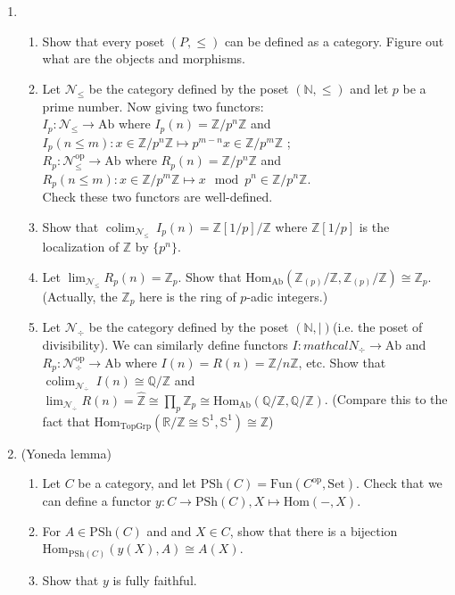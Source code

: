 \documentclass[a4paper,11pt]{article}
\def\bb#1{\mathbb{#1}}
\def\bZ{\mathbb{Z}}
\def\Zmd#1{\bZ/#1\bZ}
\def\mrm#1{\mathrm{#1}}
\def\Hom{\mathrm{Hom}}
\def\Ab{\mathrm{Ab}}
\def\PSh{\mathrm{PSh}}
\DeclareMathOperator{\colim}{colim}
\begin{document}
\begin{enumerate}[1.]
\item
\begin{enumerate}
    \item Show that every poset $(P,\leq)$ can be defined as a category. Figure out what are the objects and morphisms.
    \item Let $ \mathcal{N}_{\leq} $ be the category defined by the poset $ (\bb{N},\leq)$ and let $p$ be a prime number. Now giving two functors: \\$I_p: \mathcal{N}_{\leq} \to \mrm{Ab} $ where $I_p(n)=\Zmd{p^n}$ and $I_p(n\leq m): x\in \Zmd{p^n} \mapsto p^{m-n}x\in \Zmd{p^m}$ ;
    \\ $R_p: \mathcal{N}_{\leq}^{\mrm{op}} \to \mrm{Ab} $ where $R_p(n)=\Zmd{p^n}$ and $R_p(n\leq m): x \in \Zmd{p^m} \mapsto x \mod p^n \in \Zmd{p^n}$.
    \\ Check these two functors are well-defined.
    \item Show that $\colim_{\mathcal{N}_{\leq}}\  I_p(n) = \bZ[1/p]/\bZ $ where $\bZ[1/p]$ is the localization of $\bZ$ by $\{p^n\}$.
    \item Let $\lim_{\mathcal{N}_{\leq}}  R_p(n) = \bZ_p$. Show that $\Hom_{\Ab}(\bZ_{(p)}/\bZ ,\bZ_{(p)}/\bZ )\cong \bZ_p$. (Actually, the $\bZ_p$ here is the ring of $p$-adic integers.)
    \item Let $ \mathcal{N}_{\div} $ be the category defined by the poset $ (\bb{N},\mid )$(i.e. the poset of divisibility). We can similarly define functors $I :mathcal{N}_{\div} \to \mrm{Ab}$ and $R_p: \mathcal{N}_{\div}^{\mrm{op}} \to \mrm{Ab} $ where $I(n)=R(n)=\Zmd{n}$, etc. Show that $\colim_{\mathcal{N}_{\div}}\ I(n) \cong \bb{Q}/\bZ$ and $\lim_{\mathcal{N}_{\div}} R(n) = \hat{\bZ} \cong \prod _p \bZ_p \cong \Hom_{\Ab}(\bb{Q}/\bZ,\bb{Q}/\bZ)$. (Compare this to the fact that $\Hom_{\mrm{TopGrp}}(\bb{R}/\bZ\cong \bb{S}^1,\bb{S}^1)\cong \bZ$)
\end{enumerate}
\item (Yoneda lemma) 
\begin{enumerate}
    \item Let $C$ be a category, and let $  \PSh(C)=\mrm{Fun}(C^{\mrm{op}},\mrm{Set}) $. Check that we can define a functor $y: C\to \PSh(C), X \mapsto \Hom(-,X)$.
    \item For $A\in \PSh(C)$ and and $X \in C$, show that there
    is a bijection $\Hom_{\PSh(C)}(y(X),A)\cong A(X)$.
    \item Show that $y$ is fully faithful.
\end{enumerate}


\end{enumerate}
\end{document}
